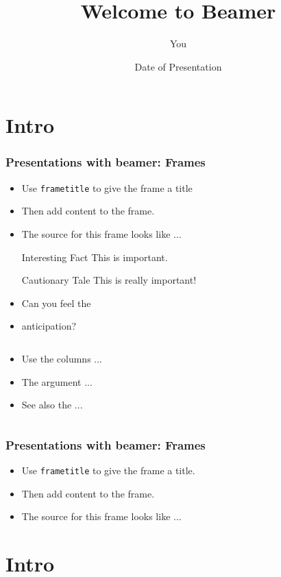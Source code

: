\documentclass{beamer}
\title{Welcome to Beamer}
\author{You}
\institute{Where You're From}
\date{Date of Presentation}
\begin{document}
\section{Intro}
\begin{frame}
\frametitle{Presentations with beamer: Frames}

\begin{itemize}

\item Use \texttt{frametitle} to give the frame a title
\item Then add content to the frame.
\item The source for this frame looks like ...
\begin{block}{Interesting Fact}
This is important.
\end{block}




\begin{alertblock}{Cautionary Tale}
This is really important!
\end{alertblock}
\end{itemize}

\begin{itemize}
\item Can you feel the
\pause \item anticipation?
\end{itemize}
\end{frame}


\begin{frame}
\begin{columns}
\begin{column}{0.4\textwidth}
\begin{itemize}
\item Use the columns ...
\item The argument ...
\item See also the ...
\end{itemize}
\end{column}
\begin{column}{0.6\textwidth}
\end{column}
\end{columns}
\frametitle{Presentations with beamer: Frames}
\begin{itemize}
\item Use \texttt{frametitle} to give the frame a title.
\item Then add content to the frame.
\item The source for this frame looks like ...
\end{itemize}
\end{frame}



\section{Intro}
\end{document}
